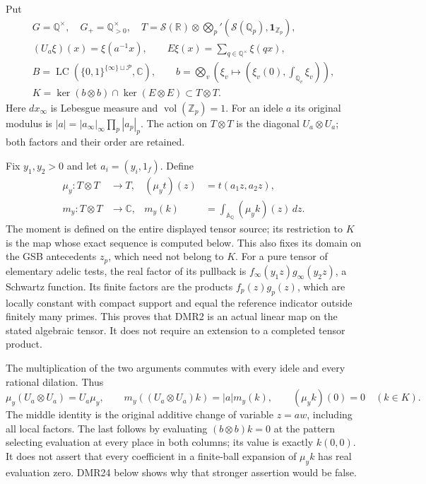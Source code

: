 Put
\begin{equation}\tag{DMR1}
\begin{gathered}
G=\mathbb Q^\times,\quad G_+=\mathbb Q_{>0}^\times,\quad
T=\mathcal S(\mathbb R)\otimes\bigotimes_p'
       (\mathcal S(\mathbb Q_p),\mathbf1_{\mathbb Z_p}),\\
(U_a\xi)(x)=\xi(a^{-1}x),\qquad
E\xi(x)=\sum_{q\in\mathbb Q^\times}\xi(qx),\\
B=\operatorname{LC}(\{0,1\}^{\{\infty\}\sqcup\mathcal P},\mathbb C),
\qquad
b=\bigotimes_v\left(\xi_v\mapsto
                  (\xi_v(0),\int_{\mathbb Q_v}\xi_v)\right),\\
K=\ker(b\otimes b)\cap\ker(E\otimes E)\subset T\otimes T.
\end{gathered}
\end{equation}
Here $dx_\infty$ is Lebesgue measure and
$\operatorname{vol}(\mathbb Z_p)=1$. For an idele $a$ its original
modulus is
$|a|=|a_\infty|_\infty\prod_p|a_p|_p$.
The action on $T\otimes T$ is the diagonal $U_a\otimes U_a$;
both factors and their order are retained.

Fix $y_1,y_2>0$ and let $a_i=(y_i,1_f)$. Define
\begin{equation}\tag{DMR2}
\begin{aligned}
\mu_y:T\otimes T&\longrightarrow T,&
(\mu_yt)(z)&=t(a_1z,a_2z),\\
m_y:T\otimes T&\longrightarrow\mathbb C,&
m_y(k)&=\int_{\mathbb A_\mathbb Q}(\mu_yk)(z)\,dz.
\end{aligned}
\end{equation}
The moment is defined on the entire displayed tensor source; its
restriction to $K$ is the map whose exact sequence is computed below.
This also fixes its domain on the GSB antecedents $z_p$, which need
not belong to $K$.
For a pure tensor of elementary adelic tests, the real factor of
its pullback is $f_\infty(y_1z)g_\infty(y_2z)$, a Schwartz
function. Its finite factors are the products $f_p(z)g_p(z)$,
which are locally constant with compact support and equal the
reference indicator outside finitely many primes. This proves
that DMR2 is an actual linear map on the stated algebraic tensor.
It does not require an extension to a completed tensor product.

The multiplication of the two arguments commutes with every idele
and every rational dilation. Thus
\begin{equation}\tag{DMR3}
\mu_y(U_a\otimes U_a)=U_a\mu_y,\qquad
m_y((U_a\otimes U_a)k)=|a|m_y(k),\qquad
(\mu_yk)(0)=0\quad(k\in K).
\end{equation}
The middle identity is the original additive change of variable
$z=aw$, including all local factors. The last follows by evaluating
$(b\otimes b)k=0$ at the pattern selecting evaluation at every
place in both columns; its value is exactly $k(0,0)$.
It does not assert that every coefficient in a finite-ball expansion
of $\mu_yk$ has real evaluation zero. DMR24 below shows why that
stronger assertion would be false.

